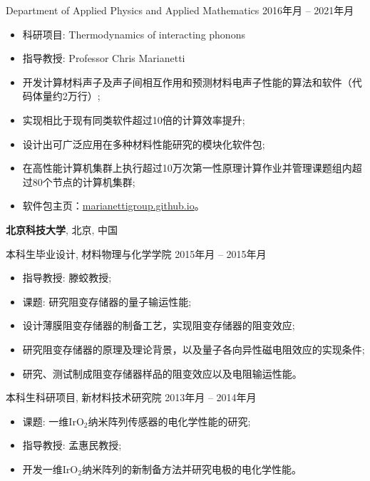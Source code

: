 \documentclass[
  a4paper,
  12pt
]{cv}
\renewcommand{\DatestampYMD}[3]{\mbox{#1年\number#2月}}
\begin{document}
Department of Applied Physics and Applied Mathematics
\hfill
\DatestampYMD{2016}{05}{17} --
\DatestampYMD{2021}{10}{20}
\begin{itemize}
\item 科研项目: Thermodynamics of interacting phonons
\item 指导教授: Professor Chris Marianetti
\item 开发计算材料声子及声子间相互作用和预测材料电声子性能的算法和软件（代码体量约2万行）;
\item 实现相比于现有同类软件超过10倍的计算效率提升;
\item 设计出可广泛应用在多种材料性能研究的模块化软件包;
\item 在高性能计算机集群上执行超过10万次第一性原理计算作业并管理课题组内超过80个节点的计算机集群;
\item 软件包主页：\href{https://marianettigroup.github.io}{marianettigroup.github.io}。
\end{itemize}

{\textbf{北京科技大学}},
北京, 中国

本科生毕业设计, 
材料物理与化学学院
\hfill
\DatestampYMD{2015}{02}{01} --
\DatestampYMD{2015}{06}{25}
\begin{itemize}
\item 指导教授: 滕蛟教授;
\item 课题: 研究阻变存储器的量子输运性能; 
\item 设计薄膜阻变存储器的制备工艺，实现阻变存储器的阻变效应; 
\item 研究阻变存储器的原理及理论背景，以及量子各向异性磁电阻效应的实现条件; 
\item 研究、测试制成阻变存储器样品的阻变效应以及电阻输运性能。
\end{itemize}


\vspace{.25em}
本科生科研项目,
新材料技术研究院
\hfill
\DatestampYMD{2013}{10}{05} --
\DatestampYMD{2014}{05}{31}
\begin{itemize}
\item 课题: 一维IrO$_{2}$纳米阵列传感器的电化学性能的研究; 
\item 指导教授: 孟惠民教授; 
\item 开发一维IrO$_{2}$纳米阵列的新制备方法并研究电极的电化学性能。
\end{itemize}
\end{document}
